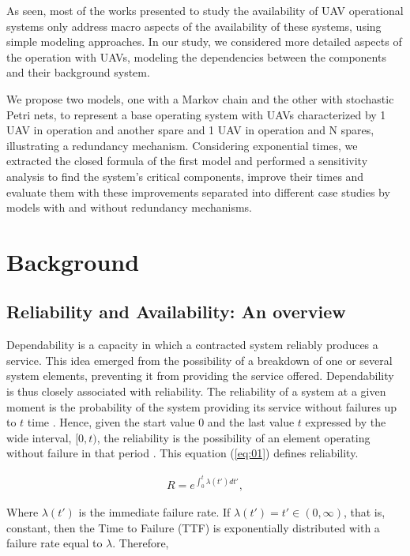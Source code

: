 \documentclass[conference]{IEEEtran}
\begin{document}
As seen, most of the works presented to study the availability of UAV operational systems only address macro aspects of the availability of these systems, using simple modeling approaches. In our study, we considered more detailed aspects of the operation with UAVs, modeling the dependencies between the components and their background system. 

We propose two models, one with a Markov chain and the other with stochastic Petri nets, to represent a base operating system with UAVs characterized by 1 UAV in operation and another spare and 1 UAV in operation and N spares, illustrating a redundancy mechanism. Considering exponential times, we extracted the closed formula of the first model and performed a sensitivity analysis to find the system’s critical components, improve their times and evaluate them with these improvements separated into different case studies by models with and without redundancy mechanisms.



\section{Background}\label{sec:background}

\subsection{Reliability and Availability: An overview}
Dependability is a capacity in which a contracted system reliably produces a service. This idea emerged from the possibility of a breakdown of one or several system elements, preventing it from providing the service offered. Dependability is thus closely associated with reliability. The reliability of a system at a given moment is the probability of the system providing its service without failures up to $t$ time \citep{avizienis2004basic}. Hence, given the start value $0$ and the last value $t$ expressed by the wide interval, $[0,t)$, the reliability is the possibility of an element operating without failure in that period \citep{trivedi2008probability}. This equation (\ref{eq:01}) defines reliability.

\begin{align}\label{eq:01}
R = e^{\int_{0}^{t} \lambda(t')dt'},
\end{align}

Where $\lambda (t')$ is the immediate failure rate. If $\lambda (t') = t'\in (0,\infty)$, that is, constant, then the Time to Failure (TTF) is exponentially distributed with a failure rate equal to $\lambda$. Therefore,
\end{document}
